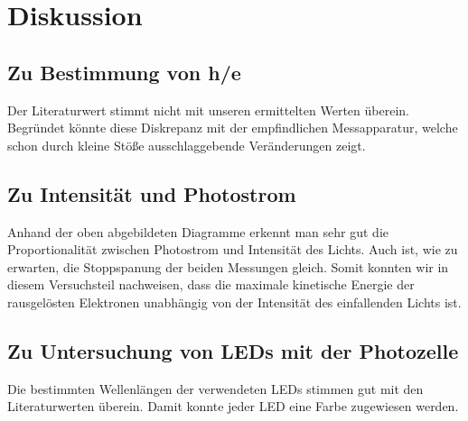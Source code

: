 \documentclass{scrartcl}
\begin{document}
\section{Diskussion}
	\subsection{Zu Bestimmung von h/e}
	Der Literaturwert stimmt nicht mit unseren ermittelten Werten überein. Begründet könnte diese Diskrepanz mit der empfindlichen Messapparatur, welche schon durch kleine Stöße ausschlaggebende
	Veränderungen zeigt. 
	
	\subsection{Zu Intensität und Photostrom}
	Anhand der oben abgebildeten Diagramme erkennt man sehr gut die Proportionalität zwischen Photostrom und Intensität des Lichts. Auch ist, wie zu erwarten, die Stoppspanung der beiden 		    Messungen gleich. Somit konnten wir in diesem Versuchsteil nachweisen, dass die maximale    kinetische Energie der rausgelösten Elektronen unabhängig von der Intensität des einfallenden Lichts  ist.
	
	\subsection{Zu Untersuchung von LEDs mit der Photozelle}
	Die bestimmten Wellenlängen der verwendeten LEDs stimmen gut mit den Literaturwerten überein. Damit konnte jeder LED eine Farbe zugewiesen werden.




\end{document}

